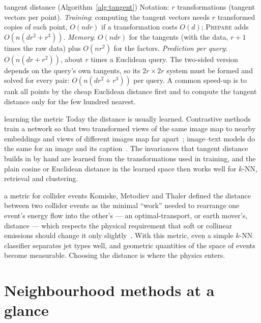 \documentclass[11pt]{article}
\begin{document}
\begin{runtime}{tangent distance (Algorithm~\ref{alg:tangent})}
Notation: $r$ transformations (tangent vectors per point). \emph{Training}: computing the tangent vectors needs $r$
transformed copies of each point, $O(ndr)$ if a transformation costs $O(d)$; \textsc{Prepare} adds
$O(n(dr^2 + r^3))$. \emph{Memory}: $O(ndr)$ for the tangents (with the data, $r + 1$ times the raw data) plus $O(nr^2)$ for the
factors. \emph{Prediction per query}: $O(n(dr + r^2))$, about $r$ times a Euclidean query. The two-sided version
depends on the query's own tangents, so its $2r \times 2r$ system must be formed and solved for every pair:
$O(n(dr^2 + r^3))$ per query. A common speed-up is to rank all points by the cheap Euclidean distance first and to
compute the tangent distance only for the few hundred nearest.
\end{runtime}

\begin{modern}{learning the metric}
Today the distance is usually learned. Contrastive methods train a network so that two transformed views of the same
image map to nearby embeddings and views of different images map far apart~\cite{chen2020}; image--text models do the
same for an image and its caption~\cite{radford2021}. The invariances that tangent distance builds in by hand are
learned from the transformations used in training, and the plain cosine or Euclidean distance in the learned space
then works well for $k$-NN, retrieval and clustering.
\end{modern}

\begin{physics}{a metric for collider events}
Komiske, Metodiev and Thaler defined the distance between two collider events as the minimal ``work'' needed to
rearrange one event's energy flow into the other's --- an optimal-transport, or earth mover's, distance --- which
respects the physical requirement that soft or collinear emissions should change it only slightly~\cite{komiske2019}.
With this metric, even a simple $k$-NN classifier separates jet types well, and geometric quantities of the space of events
become measurable. Choosing the distance is where the physics enters.
\end{physics}

\section{Neighbourhood methods at a glance}\label{sec:glance}
\end{document}
